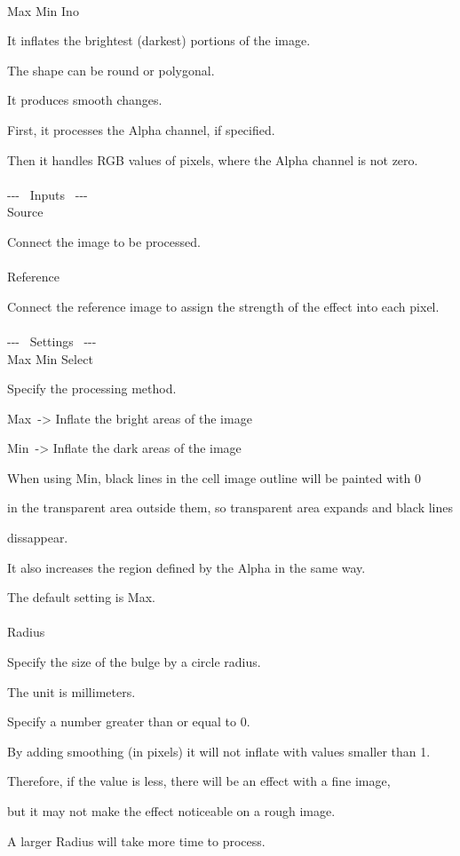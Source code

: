 \documentclass[a4paper,12pt]{article}
\begin{document}
\thispagestyle{empty}

\Large
\noindent \\
Max Min Ino\medskip
\par
\normalsize
It inflates the brightest (darkest) portions of the image.\\
\par
The shape can be round or polygonal.\par
It produces smooth changes.\\
\par
First, it processes the Alpha channel, if specified.\par
Then it handles RGB values of pixels, where the Alpha channel is not zero.\\
\\
-{-}- \ Inputs \ -{-}-\\
Source\par
Connect the image to be processed.\\
\\
Reference\par
Connect the reference image to assign the strength of the effect into each pixel.\\
\\
-{-}- \ Settings \ -{-}-\\
Max Min Select\par
Specify the processing method.\par
\textquotedbl Max\textquotedbl \ -> Inflate the bright areas of the image\par
\textquotedbl Min\textquotedbl \ -> Inflate the dark areas of the image\par
When using \textquotedbl Min\textquotedbl , black lines in the cell image outline will be painted with 0\par 
in the transparent area outside them, so transparent area expands and black lines\par 
dissappear.\par
It also increases the region defined by the Alpha in the same way.\par
The default setting is \textquotedbl Max\textquotedbl .\\
\\
Radius\par
Specify the size of the bulge by a circle radius.\par
The unit is millimeters.\par
Specify a number greater than or equal to 0.\par
By adding smoothing (in pixels) it will not inflate with values smaller than 1.\par
Therefore, if the value is less, there will be an effect with a fine image,\par
but it may not make the effect noticeable on a rough image.\par
A larger Radius will take more time to process.\\
\end{document}
